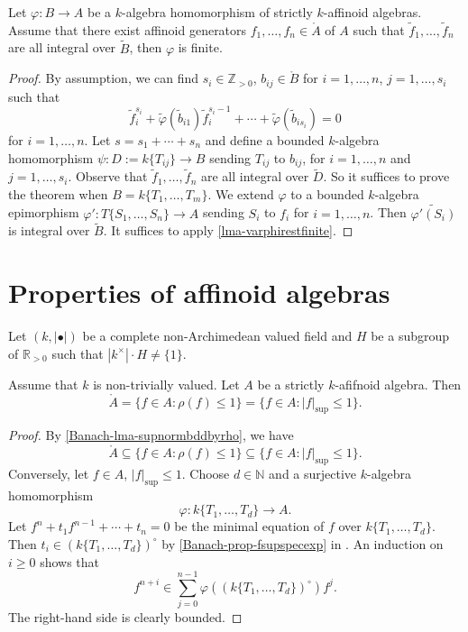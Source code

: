 \begin{lemma}\label{lma-reductionfiniteimplyfinite}
    Let $\varphi:B\rightarrow A$ be a $k$-algebra homomorphism of strictly $k$-affinoid algebras. Assume that there exist affinoid generators $f_1,\ldots,f_n\in \mathring{A}$ of $A$ such that $\tilde{f}_1,\ldots,\tilde{f}_n$ are all integral over $\tilde{B}$, then $\varphi$ is finite.
\end{lemma}
\begin{proof}
    By assumption, we can find $s_i\in \mathbb{Z}_{>0}$, $b_{ij}\in \mathring{B}$ for $i=1,\ldots,n$, $j=1,\ldots,s_i$ such that
    \[
        \tilde{f}_i^{s_i}+\tilde{\varphi}(\tilde{b}_{i1}) \tilde{f}_i^{s_i-1}+\cdots+\tilde{\varphi}(\tilde{b}_{is_i})=0 
    \]
    for $i=1,\ldots,n$. Let $s=s_1+\cdots+s_n$ and define a bounded $k$-algebra homomorphism $\psi:D:=k\{T_{ij}\}\rightarrow B$ sending $T_{ij}$ to $b_{ij}$, for $i=1,\ldots,n$ and $j=1,\ldots,s_i$. Observe that $\tilde{f}_1,\ldots,\tilde{f}_n$ are all integral over $\tilde{D}$. So it suffices to prove the theorem when $B=k\{T_1,\ldots,T_m\}$. We extend $\varphi$ to a bounded $k$-algebra epimorphism $\varphi':T\{S_1,\ldots,S_n\}\rightarrow A$ sending $S_i$ to $f_i$ for $i=1,\ldots,n$.  Then $\tilde{\varphi'(S_i)}$ is integral over $\tilde{B}$. It suffices to apply \cref{lma-varphirestfinite}.
\end{proof}

\section{Properties of affinoid algebras}
Let $(k,|\bullet|)$ be a complete non-Archimedean valued field and $H$ be a subgroup of $\mathbb{R}_{>0}$ such that $|k^{\times}|\cdot H\neq \{1\}$.

\begin{proposition}\label{prop-powerbddinstrictlyaff}
    Assume that $k$ is non-trivially valued. Let $A$ be a strictly $k$-afifnoid algebra. Then
    \[
        \mathring{A}=\{f\in A: \rho(f)\leq 1\}=\{f\in A: |f|_{\sup}\leq 1\}.    
    \]
\end{proposition}
\begin{proof}
    By \cref{Banach-lma-supnormbddbyrho}, we have 
    \[
        \mathring{A}\subseteq \{f\in A: \rho(f)\leq 1\}\subseteq \{f\in A: |f|_{\sup}\leq 1\}. 
    \]
    Conversely, let $f\in A$, $|f|_{\sup}\leq 1$. Choose $d\in \mathbb{N}$ and a surjective $k$-algebra homomorphism
    \[
        \varphi:k\{T_1,\ldots,T_d\}\rightarrow A.  
    \]
    Let $f^n+t_1f^{n-1}+\cdots+t_n=0$ be the minimal equation of $f$ over $k\{T_1,\ldots,T_d\}$. Then $t_i\in (k\{T_1,\ldots,T_d\})^{\circ}$ by \cref{Banach-prop-fsupspecexp} in . An induction on $i\geq 0$ shows that
    \[
        f^{n+i}\in \sum_{j=0}^{n-1}\varphi\left((k\{T_1,\ldots,T_d\})^{\circ} \right)f^j.
    \]
    The right-hand side is clearly bounded.
\end{proof}


